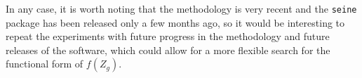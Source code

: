 In any case, it is worth noting that the methodology is very recent and the \texttt{seine} package has been released only a few months ago, so it would be interesting to repeat the experiments with future progress in the methodology and future releases of the software, which could allow for a more flexible search for the functional form of $f(Z_g)$.
















